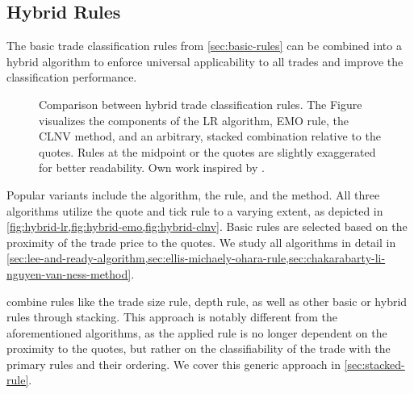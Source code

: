 \subsection{Hybrid Rules}\label{sec:hybrid-rules}

The basic trade classification rules from \cref{sec:basic-rules} can be combined into a hybrid algorithm to enforce universal applicability to all trades and improve the classification performance.


\begin{figure}[ht!]
  \hfill%
  \hfill%
  \hfill%
  \caption[Comparison Between Hybrid Trade Classification Rules]{Comparison between hybrid trade classification rules. The Figure visualizes the components of the \acrshort{LR} algorithm, \acrshort{EMO} rule, the \acrshort{CLNV} method, and an arbitrary, stacked combination relative to the quotes. Rules at the midpoint or the quotes are slightly exaggerated for better readability. Own work inspired by \textcite[][167]{poppeSensitivityVPINChoice2016}.}
  \label{fig:hybrid-algorithms}
\end{figure}

Popular variants include the  algorithm, the  rule, and the  method. All three algorithms utilize the quote and tick rule to a varying extent, as depicted in \cref{fig:hybrid-lr,fig:hybrid-emo,fig:hybrid-clnv}. Basic rules are selected based on the proximity of the trade price to the quotes. We study all algorithms in detail in \cref{sec:lee-and-ready-algorithm,sec:ellis-michaely-ohara-rule,sec:chakarabarty-li-nguyen-van-ness-method}.

\textcite[][18]{grauerOptionTradeClassification2022} combine rules like the trade size rule, depth rule, as well as other basic or hybrid rules through stacking. This approach is notably different from the aforementioned algorithms, as the applied rule is no longer dependent on the proximity to the quotes, but rather on the classifiability of the trade with the primary rules and their ordering. We cover this generic approach in \cref{sec:stacked-rule}.
